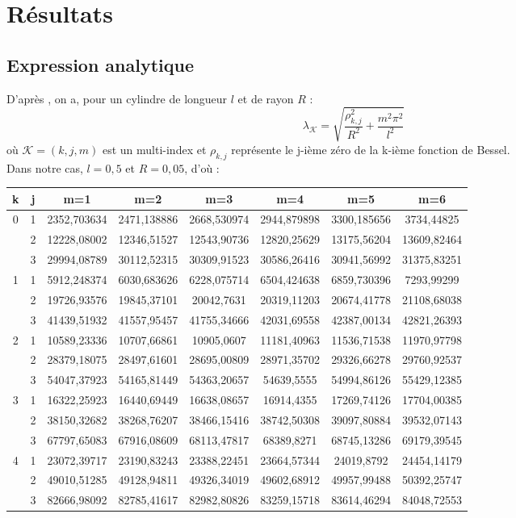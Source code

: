 \chapter{Résultats}

\section{Expression analytique}

D'après \cite{Saks2005}, on a, pour un cylindre de longueur $l$ et de rayon $R$ :
\[
\lambda_\mathcal{K} = \sqrt{\frac{\rho_{k,j}^2}{R^2} + \frac{m^2\pi^2}{l^2}}
\]
où $\mathcal{K}=(k,j,m)$ est un multi-index et $\rho_{k,j}$ représente le j-ième zéro de la k-ième fonction de Bessel.\\
Dans notre cas, $l=0,5$ et $R=0,05$, d'où :\\
\begin{center}
\begin{tabular}{|*{8}{c|}}
\hline
k & j & m=1 & m=2 & m=3 & m=4 & m=5 & m=6\\
\hline
\multirow{3}{*}{0}
& 1 & 2352,703634&2471,138886&2668,530974&2944,879898&3300,185656&3734,44825\\
& 2 & 12228,08002&12346,51527&12543,90736&12820,25629&13175,56204&13609,82464\\
& 3 & 29994,08789&30112,52315&30309,91523&30586,26416&30941,56992&31375,83251\\
\hline
\multirow{3}{*}{1}
& 1 &5912,248374&6030,683626&6228,075714&6504,424638&6859,730396&7293,99299\\
& 2 &19726,93576&19845,37101&20042,7631&20319,11203&20674,41778&21108,68038\\
& 3 &41439,51932&41557,95457&41755,34666&42031,69558&42387,00134&42821,26393\\ \hline
\multirow{3}{*}{2}
& 1 &10589,23336&10707,66861&10905,0607&11181,40963&11536,71538&11970,97798\\
& 2 &28379,18075&28497,61601&28695,00809&28971,35702&29326,66278&29760,92537\\
& 3 &54047,37923&54165,81449&54363,20657&54639,5555&54994,86126&55429,12385\\
\hline
\multirow{3}{*}{3}
& 1 &16322,25923&16440,69449&16638,08657&16914,4355&17269,74126&17704,00385\\
& 2 &38150,32682&38268,76207&38466,15416&38742,50308&39097,80884&39532,07143\\
& 3 &67797,65083&67916,08609&68113,47817&68389,8271&68745,13286&69179,39545\\
\hline
\multirow{3}{*}{4}
& 1 &23072,39717&23190,83243&23388,22451&23664,57344&24019,8792&24454,14179\\
& 2 &49010,51285&49128,94811&49326,34019&49602,68912&49957,99488&50392,25747\\
& 3 &82666,98092&82785,41617&82982,80826&83259,15718&83614,46294&84048,72553\\
\hline
\end{tabular}
\end{center}

